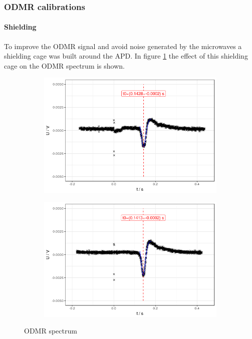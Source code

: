 \subsubsection{ODMR calibrations}
\label{sec:odmr-cal}
\paragraph{Shielding}
To improve the ODMR signal and avoid noise generated by the microwaves a shielding cage was built around the APD. In figure \ref{fig:odmr-shield} the effect of this shielding cage on the ODMR spectrum is shown.
\begin{figure}
	\begin{subfigure}{0.5\textwidth}
		\includegraphics[width=\textwidth]{../figures/odmr-cal-1.png}
	\end{subfigure}
	\begin{subfigure}{0.5\textwidth}	\includegraphics[width=\textwidth]{../figures/odmr-cal-2.png}
	\end{subfigure}
	\caption{ODMR spectrum}
	\label{fig:odmr-shield}
\end{figure}
